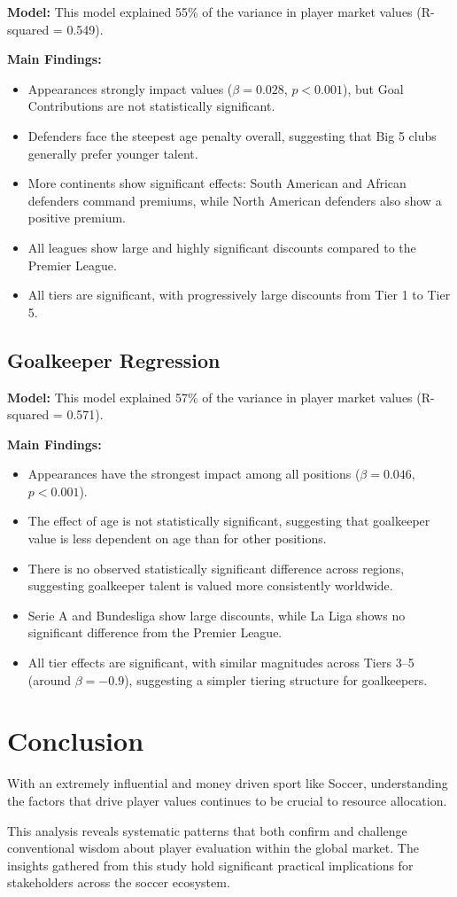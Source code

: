 \documentclass[12pt,a4paper]{article}
\begin{document}
\textbf{Model:} This model explained 55\% of the variance in player market values (R-squared = 0.549).

\textbf{Main Findings:}
\begin{itemize}
    \item Appearances strongly impact values ($\beta = 0.028$, $p < 0.001$), but Goal Contributions are not statistically significant. 
    \item Defenders face the steepest age penalty overall, suggesting that Big 5 clubs generally prefer younger talent. 
    \item More continents show significant effects: South American and African defenders command premiums, while North American defenders also show a positive premium.
    \item All leagues show large and highly significant discounts compared to the Premier League. 
    \item All tiers are significant, with progressively large discounts from Tier 1 to Tier 5.
\end{itemize}

\subsection{Goalkeeper Regression}
\label{subsec:Goalkeeper}

\textbf{Model:} This model explained 57\% of the variance in player market values (R-squared = 0.571).

\textbf{Main Findings:}
\begin{itemize}
    \item Appearances have the strongest impact among all positions ($\beta = 0.046$, $p < 0.001$). 
    \item The effect of age is not statistically significant, suggesting that goalkeeper value is less dependent on age than for other positions.  
    \item There is no observed statistically significant difference across regions, suggesting goalkeeper talent is valued more consistently worldwide. 
    \item Serie A and Bundesliga show large discounts, while La Liga shows no significant difference from the Premier League.
    \item All tier effects are significant, with similar magnitudes across Tiers 3–5 (around $\beta = -0.9$), suggesting a simpler tiering structure for goalkeepers.
\end{itemize}

\section{Conclusion}
\label{sec:Conclusion}
With an extremely influential and money driven sport like Soccer, understanding the factors that drive player values continues to be crucial to resource allocation. 

This analysis reveals systematic patterns that both confirm and challenge conventional wisdom about player evaluation within the global market. 
The insights gathered from this study hold significant practical implications for stakeholders across the soccer ecosystem. 

 

\end{document}

